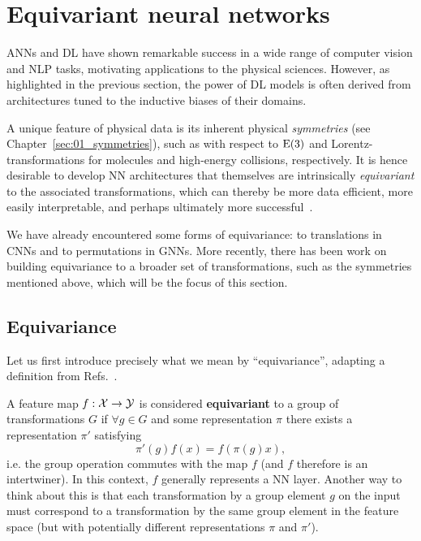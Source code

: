 \section{Equivariant neural networks}
\label{sec:03_ml_equivariantnns}

ANNs and DL have shown remarkable success in a wide range of computer vision and NLP tasks, motivating applications to the physical sciences.
However, as highlighted in the previous section, the power of DL models is often derived from architectures tuned to the inductive biases of their domains.

A unique feature of physical data is its inherent physical \textit{symmetries} (see Chapter~\ref{sec:01_symmetries}), such as with respect to $\EE[3]$ and Lorentz-transformations for molecules and high-energy collisions, respectively.
It is hence desirable to develop NN architectures that themselves are intrinsically \textit{equivariant} to the associated transformations, which can thereby be more data efficient, more easily interpretable, and perhaps ultimately more successful~\cite{thomas2018tensor}. 

We have already encountered some forms of equivariance: to translations in CNNs and to permutations in GNNs.
More recently, there has been work on building equivariance to a broader set of transformations, such as the symmetries mentioned above, which will be the focus of this section.

\subsection{Equivariance}
\label{sec:06_equivariantnns_equiv}

Let us first introduce precisely what we mean by ``equivariance'', adapting a definition from Refs.~\cite{cohen2016group, cohen2016steerable, worrall2017harmonic, weiler2019general}.

\begin{definition}
\label{def:06_equivariantnns_equiv}
A feature map $f: \mathcal{X} \rightarrow \mathcal{Y}$ is considered \textbf{equivariant} to a group of transformations $G$ if $\forall g \in G$ and some representation $\pi$ there exists a representation $\pi'$ satisfying  
\begin{equation}\label{eq:06_equivariantnns_equiv}
    \pi'(g)f(x) = f(\pi(g)x),
\end{equation}
i.e. the group operation commutes with the map $f$ (and $f$ therefore is an intertwiner).
In this context, $f$ generally represents a NN layer.
Another way to think about this is that each transformation by a group element $g$ on the input must correspond to a transformation by the same group element in the feature space (but with potentially different representations $\pi$ and $\pi'$). 
\end{definition}

